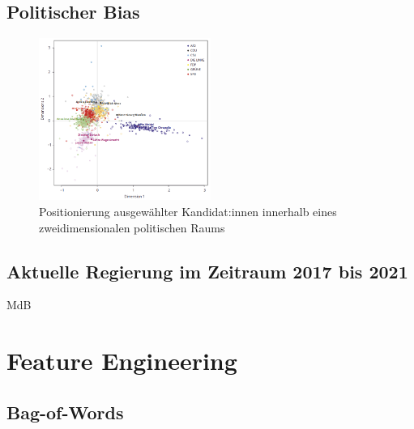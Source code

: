 \subsection{Politischer Bias}

\begin{figure}[H]
    \centering
    \includegraphics[width=0.5\textwidth]{data/images/positionierung_ausgewaehlter_kandidaten.png}
    \caption[Positionierung ausgewählter Kandidat:innen]{Positionierung ausgewählter Kandidat:innen innerhalb eines zweidimensionalen politischen Raums \autocite{saltzer_bundestagswahl_2022}} \label{fig:positionierungAusgewaehlterKanidaten}
\end{figure}

\subsection{Aktuelle Regierung im Zeitraum 2017 bis 2021}


\ac{MdB}




\section{Feature Engineering}

\subsection{Bag-of-Words}

